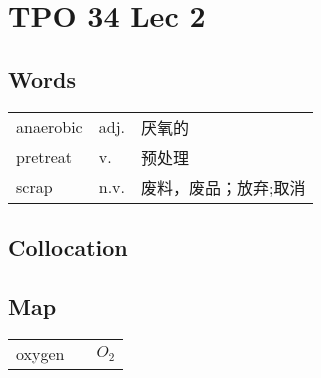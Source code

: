 \section{TPO 34 Lec 2}

\subsection{Words}

\begin{tabular}{lll}
    anaerobic & adj. & 厌氧的         \\
    pretreat  & v.   & 预处理         \\
    scrap     & n.v. & 废料，废品；放弃;取消 \\
\end{tabular}

\subsection{Collocation}

\subsection{Map}

\begin{tabular}{rc@{\quad$\to$\quad}l}
    oxygen &  & $O_{2}$ \\
\end{tabular}

